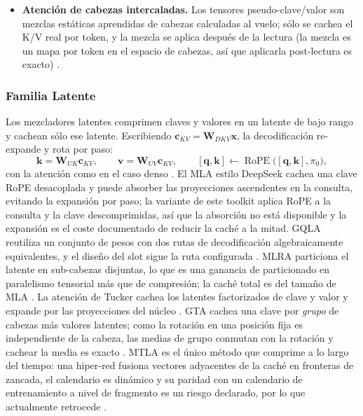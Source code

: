 \begin{itemize}[leftmargin=*]
    \item \textbf{Atención de cabezas intercaladas.} Los tensores pseudo-clave/valor son mezclas estáticas aprendidas de cabezas calculadas al vuelo; sólo se cachea el K/V real por token, y la mezcla se aplica después de la lectura (la mezcla es un mapa por token en el espacio de cabezas, así que aplicarla post-lectura es exacto) \citep{duvvuri_iha_2026}.
\end{itemize}

\subsubsection{Familia Latente}

Los mezcladores latentes comprimen claves y valores en un latente de bajo rango y cachean sólo ese latente. Escribiendo $\mathbf{c}_{KV} = \mathbf{W}_{DKV}\mathbf{x}$, la decodificación re-expande y rota por paso:
\[
\mathbf{k} = \mathbf{W}_{UK}\mathbf{c}_{KV},\qquad
\mathbf{v} = \mathbf{W}_{UV}\mathbf{c}_{KV},\qquad
[\mathbf{q},\mathbf{k}] \leftarrow \operatorname{RoPE}\big([\mathbf{q},\mathbf{k}], \pi_0\big),
\]
con la atención como en el caso denso \citep{mehta_mla_2025}. El MLA estilo DeepSeek cachea una clave RoPE desacoplada y puede absorber las proyecciones ascendentes en la consulta, evitando la expansión por paso; la variante de este toolkit aplica RoPE a la consulta y la clave descomprimidas, así que la absorción no está disponible y la expansión es el coste documentado de reducir la caché a la mitad. GQLA reutiliza un conjunto de pesos con dos rutas de decodificación algebraicamente equivalentes, y el diseño del slot sigue la ruta configurada \citep{meng_gqla_2026}. MLRA particiona el latente en sub-cabezas disjuntas, lo que es una ganancia de particionado en paralelismo tensorial más que de compresión; la caché total es del tamaño de MLA \citep{liu_mlra_2026}. La atención de Tucker cachea los latentes factorizados de clave y valor y expande por las proyecciones del núcleo \citep{klein_tucker_2026}. GTA cachea una clave por \emph{grupo} de cabezas más valores latentes; como la rotación en una posición fija es independiente de la cabeza, las medias de grupo conmutan con la rotación y cachear la media es exacto \citep{sun_gta_2025}. MTLA es el único método que comprime a lo largo del tiempo: una hiper-red fusiona vectores adyacentes de la caché en fronteras de zancada, el calendario es dinámico y su paridad con un calendario de entrenamiento a nivel de fragmento es un riesgo declarado, por lo que actualmente retrocede \citep{deng_mtla_2025}.

